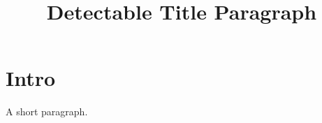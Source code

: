 \documentclass[letterpaper]{article}
\begin{document}
\title{Detectable Title Paragraph}\author{}\date{}\maketitle
\section{Intro}
A short paragraph.
\end{document}
